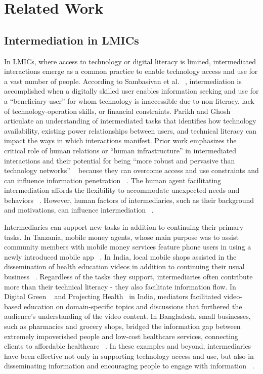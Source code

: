 \section{Related Work}

\subsection{Intermediation in LMICs}


In LMICs, where access to technology or digital literacy is limited, intermediated interactions emerge as a common practice to enable technology access and use for a vast number of people. According to Sambasivan et al. ~\cite{10.1145/1753326.1753718}, intermediation is accomplished when a digitally skilled user enables information seeking and use for a ``beneficiary-user” for whom technology is inaccessible due to non-literacy, lack of technology-operation skills, or financial constraints. Parikh and Ghosh ~\cite{1626204} articulate an understanding of intermediated tasks that identifies how technology availability, existing power relationships between users, and technical literacy can impact the ways in which interactions manifest. Prior work emphasizes the critical role of human relations or ``human infrastructure” in intermediated interactions and their potential for being ``more robust and pervasive than technology networks” ~\cite{10.1145/2369220.2369258} because they can overcome access and use constraints and can influence information penetration ~\cite{10.1145/2909609.2909664, 10.1145/1753326.1753610}. The human agent facilitating intermediation affords the flexibility to accommodate unexpected needs and behaviors ~\cite{10.1145/2737856.2738023}. However, human factors of intermediaries, such as their background and motivations, can influence intermediation ~\cite{10.1145/3449118, 10.1145/3313831.3376465, 10.1145/3411764.3445410}.

Intermediaries can support new tasks in addition to continuing their primary tasks. In Tanzania, mobile money agents, whose main purpose was to assist community members with mobile money services  feature phone users in using a newly introduced mobile app ~\cite{10.1145/3613904.3642099}. In India, local mobile shops assisted in the dissemination of health education videos in addition to continuing their usual business ~\cite{10.1145/2909609.2909655}. Regardless of the tasks they support, intermediaries often contribute more than their technical literacy - they also facilitate information flow. In Digital Green ~\cite{4937388} and Projecting Health~\cite{10.1145/2737856.2738023} in India, mediators facilitated video-based education on domain-specific topics and discussions that furthered the audience’s understanding of the video content. In Bangladesh, small businesses, such as pharmacies and grocery shops, bridged the information gap between extremely impoverished people and low-cost healthcare services, connecting clients to affordable healthcare ~\cite{10.1145/3449118}. In these examples and beyond, intermediaries have been effective not only in supporting technology access and use, but also in disseminating information and encouraging people to engage with information ~\cite{10.1145/2369220.2369253}. 


